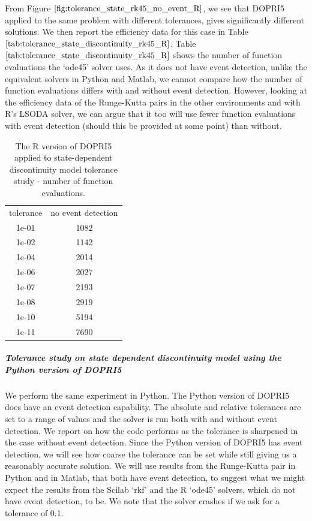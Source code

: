 From Figure $\ref{fig:tolerance_state_rk45_no_event_R}$, we see that DOPRI5 applied to the same problem with different tolerances, gives significantly different solutions. We then report the efficiency data for this case in Table $\ref{tab:tolerance_state_discontinuity_rk45_R}$. Table $\ref{tab:tolerance_state_discontinuity_rk45_R}$ shows the number of function evaluations the `ode45' solver uses. As it does not have event detection, unlike the equivalent solvers in Python and Matlab, we cannot compare how the number of function evaluations differs with and without event detection. However, looking at the efficiency data of the Runge-Kutta pairs in the other environments and with R's LSODA solver, we can argue that it too will use fewer function evaluations with event detection (should this be provided at some point) than without.

\begin{table}[h]
\caption {The R version of DOPRI5 applied to state-dependent discontinuity model tolerance study - number of function evaluations.} \label{tab:tolerance_state_discontinuity_rk45_R} 
\begin{center}
\begin{tabular}{ c c }
tolerance & no event detection \\
1e-01 & 1082 \\
1e-02 & 1142 \\
1e-04 & 2014 \\
1e-06 & 2027 \\
1e-07 & 2193 \\
1e-08 & 2919 \\
1e-10 & 5194 \\
1e-11 & 7690 \\
\end{tabular}
\end{center}
\end{table}

\subparagraph{Tolerance study on state dependent discontinuity model using the Python version of DOPRI5}
We perform the same experiment in Python. The Python version of DOPRI5 does have an event detection capability. The absolute and relative tolerances are set to a range of values and the solver is run both with and without event detection. We report on how the code performs as the tolerance is sharpened in the case without event detection. Since the Python version of DOPRI5 has event detection, we will see how coarse the tolerance can be set while still giving us a reasonably accurate solution. We will use results from the Runge-Kutta pair in Python and in Matlab, that both have event detection, to suggest what we might expect the results from the Scilab `rkf' and  the R `ode45' solvers, which do not have event detection, to be. We note that the solver crashes if we ask for a tolerance of 0.1.

